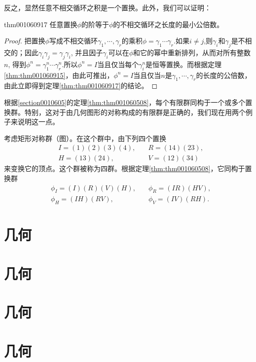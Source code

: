 反之，显然任意不相交循环之积是一个置换。此外，我们可以证明：
\begin{theorem}{}{thm001060917}
任意置换$\phi$的阶等于$\phi$的不相交循环之长度的最小公倍数。
\end{theorem}

\begin{proof}
把置换$\phi$写成不相交循环$\gamma_1,\cdots,\gamma_r$的乘积$\phi = \gamma_1\cdots\gamma_r$.如果$i \neq j$,则$\gamma_i$和$\gamma_j$是不相交的；因此$\gamma_i\gamma_j = \gamma_j\gamma_i$, 并且因子$\gamma_i$可以在$\phi$和它的幂中重新排列，从而对所有整数$n$, 得到$\phi^n = \gamma_1^n\cdots\gamma_r^n$.所以$\phi^n=I$当且仅当每个$\gamma_i^n$是恒等置换。而根据定理\ref{thm:thm001060915}，由此可推出，$\phi^n=I$当且仅当$n$是$\gamma_1,\cdots,\gamma_r$的长度的公倍数，由此立即得到定理\ref{thm:thm001060917}的结论。
\end{proof}

根据\ref{section0010605}的定理\ref{thm:thm001060508}，每个有限群同构于一个或多个置换群。特别，这对于由几何图形的对称构成的有限群是正确的，我们现在用两个例子来说明这一点。

考虑矩形对称群（图）。在这个群中，由下列四个置换
\[
\begin{aligned}
&I = (1)(2)(3)(4), \quad &R = (14)(23),\\
&H = (13)(24),\quad &V=(12)(34)
\end{aligned}
\]
来变换它的顶点。这个群被称为四群。根据定理\ref{thm:thm001060508}，它同构于置换群
\[
\begin{aligned}
&\phi_I = (I)(R)(V)(H),\quad &\phi_R = (IR)(HV),\\
&\phi_H = (IH)(RV), \quad &\phi_V = (IV)(RH).
\end{aligned}
\]

\chapter{几何}\label{chapter00109}




\chapter{几何}\label{chapter00110}



\chapter{几何}\label{chapter00111}


\chapter{几何}\label{chapter00112}

